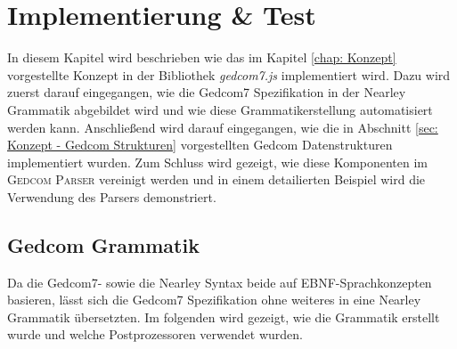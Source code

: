 \chapter{Implementierung \& Test}
\label{chap: Implementierung und Test}
In diesem Kapitel wird beschrieben wie das im Kapitel \ref{chap: Konzept} vorgestellte Konzept in der Bibliothek \textit{gedcom7.js} implementiert wird. Dazu wird zuerst darauf eingegangen, wie die Gedcom7 Spezifikation in der Nearley Grammatik abgebildet wird und wie diese Grammatikerstellung automatisiert werden kann. Anschließend wird darauf eingegangen, wie die in Abschnitt \ref{sec: Konzept - Gedcom Strukturen} vorgestellten Gedcom Datenstrukturen implementiert wurden. Zum Schluss wird gezeigt, wie diese Komponenten im \textsc{Gedcom Parser} vereinigt werden und in einem detailierten Beispiel wird die Verwendung des Parsers demonstriert. 

\section{Gedcom Grammatik}
\label{sec: Implementierung - Gedcom Grammatik}
Da die Gedcom7- sowie die Nearley Syntax beide auf EBNF-Sprachkonzepten basieren, lässt sich die Gedcom7 Spezifikation ohne weiteres in eine Nearley Grammatik übersetzten. Im folgenden wird gezeigt, wie die Grammatik erstellt wurde und welche Postprozessoren verwendet wurden. 
